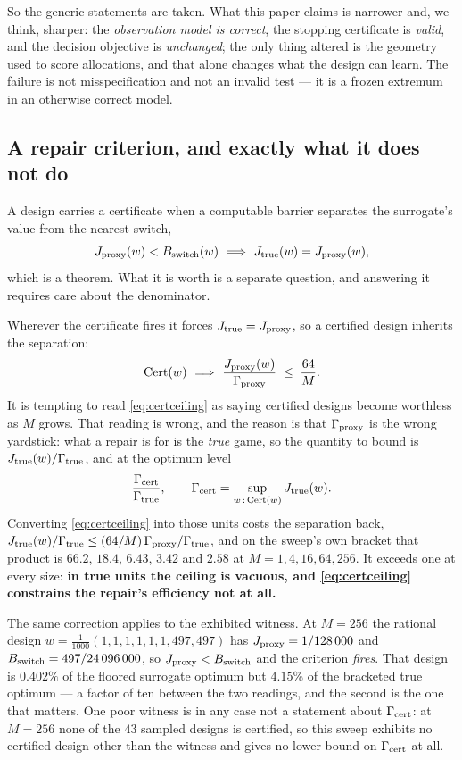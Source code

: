 So the generic statements are taken. What this paper claims is narrower and, we think,
sharper: the \emph{observation model is correct}, the stopping certificate is
\emph{valid}, and the decision objective is \emph{unchanged}; the only thing altered is
the geometry used to score allocations, and that alone changes what the design can learn.
The failure is not misspecification and not an invalid test --- it is a frozen extremum
in an otherwise correct model.

\subsection{A repair criterion, and exactly what it does not do}

A design carries a certificate when a computable barrier separates the surrogate's value
from the nearest switch,
\[
J_{\rm proxy}(w)<B_{\rm switch}(w)\ \Longrightarrow\ J_{\rm true}(w)=J_{\rm proxy}(w),
\]
which is a theorem. What it is worth is a separate question, and answering it requires
care about the denominator.

Wherever the certificate fires it forces $J_{\rm true}=J_{\rm proxy}$, so a certified
design inherits the separation:
\begin{equation}
\mathrm{Cert}(w)\ \Longrightarrow\ \frac{J_{\rm proxy}(w)}{\Gamma_{\rm proxy}}\;\le\;
\frac{64}{M}.
\label{eq:certceiling}
\end{equation}
It is tempting to read \eqref{eq:certceiling} as saying certified designs become worthless
as $M$ grows. That reading is wrong, and the reason is that $\Gamma_{\rm proxy}$ is the
wrong yardstick: what a repair is for is the \emph{true} game, so the quantity to bound is
$J_{\rm true}(w)/\Gamma_{\rm true}$, and at the optimum level
\[
\frac{\Gamma_{\rm cert}}{\Gamma_{\rm true}},
\qquad
\Gamma_{\rm cert}=\sup_{w\,:\,\mathrm{Cert}(w)}J_{\rm true}(w).
\]
Converting \eqref{eq:certceiling} into those units costs the separation back,
$J_{\rm true}(w)/\Gamma_{\rm true}\le(64/M)\,\Gamma_{\rm proxy}/\Gamma_{\rm true}$, and on
the sweep's own bracket that product is $66.2$, $18.4$, $6.43$, $3.42$ and $2.58$ at
$M=1,4,16,64,256$. It exceeds one at every size: \textbf{in true units the ceiling is
vacuous, and \eqref{eq:certceiling} constrains the repair's efficiency not at all.}
\CERT{}

The same correction applies to the exhibited witness. At $M=256$ the rational design
$w=\tfrac1{1000}(1,1,1,1,1,1,497,497)$ has $J_{\rm proxy}=1/128\,000$ and $B_{\rm
switch}=497/24\,096\,000$, so $J_{\rm proxy}<B_{\rm switch}$ and the criterion
\emph{fires}. That design is $0.402\%$ of the floored surrogate optimum but $4.15\%$ of the
bracketed true optimum --- a factor of ten between the two readings, and the second is the
one that matters. One poor witness is in any case not a statement about
$\Gamma_{\rm cert}$: at $M=256$ none of the $43$ sampled designs is certified, so this
sweep exhibits no certified design other than the witness and gives no lower bound on
$\Gamma_{\rm cert}$ at all.

